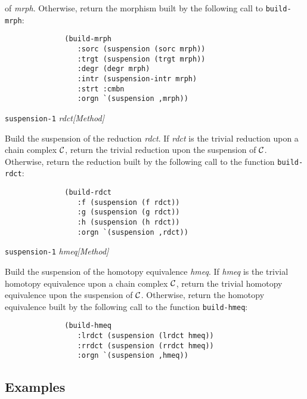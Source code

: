 {{of {\em mrph}. Otherwise, return the morphism built by the following call to
{\tt build-mrph}:
{\footnotesize\begin{verbatim}
              (build-mrph
                 :sorc (suspension (sorc mrph))
                 :trgt (suspension (trgt mrph))
                 :degr (degr mrph)
                 :intr (suspension-intr mrph)
                 :strt :cmbn
                 :orgn `(suspension ,mrph))
\end{verbatim}}
\par}
{\leftskip=5mm 
{\tt suspension-1} {\em rdct}\hfill{\em[Method]} \par}
{\leftskip=15mm 
Build the suspension of the reduction {\em rdct}. If {\em rdct} is the trivial 
reduction upon a chain complex ${\cal C}$, return the trivial reduction upon
the suspension of ${\cal C}$. Otherwise, return the reduction built by the following call to
the function {\tt build-rdct}:
{\footnotesize\begin{verbatim}
              (build-rdct
                 :f (suspension (f rdct))
                 :g (suspension (g rdct))
                 :h (suspension (h rdct))
                 :orgn `(suspension ,rdct))
\end{verbatim}}
\par}
{\leftskip=5mm 
{\tt suspension-1} {\em hmeq}\hfill{\em[Method]} \par}
{\leftskip=15mm 
Build the suspension of the  homotopy equivalence {\em hmeq}. If {\em hmeq} is the trivial 
homotopy equivalence  upon a chain complex ${\cal C}$, return the trivial homotopy equivalence upon
the suspension of ${\cal C}$. O\-ther\-wi\-se, return the homotopy equivalence built by the following call to
the function {\tt build-hmeq}:
{\footnotesize\begin{verbatim}
              (build-hmeq
                 :lrdct (suspension (lrdct hmeq))
                 :rrdct (suspension (rrdct hmeq))
                 :orgn `(suspension ,hmeq))
\end{verbatim}}
\par}
}

\subsection* {Examples}

